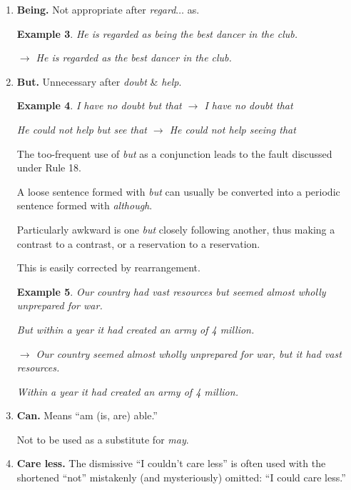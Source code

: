 \documentclass{article}
\newtheorem{example}{Example}
\begin{document}
\begin{enumerate}
\begin{example}
		$\to$ No agreement has yet been reached.
	\end{example}
	The chief exception is at the beginning of a sentence, where {\it yet} means something different.
	\begin{example}
		Yet (\emph{or} despite everything) he has not succeeded.
		
		As yet (\emph{or} so far) he has not succeeded.
	\end{example}
	\item {\bf Being.} Not appropriate after {\it regard$\ldots$} as.
	\begin{example}
		He is regarded as being the best dancer in the club.
		
		$\to$ He is regarded as the best dancer in the club.
	\end{example}
	\item {\bf But.} Unnecessary after {\it doubt} \& {\it help}.
	\begin{example}
		I have no doubt but that $\to$ I have no doubt that
		
		He could not help but see that $\to$ He could not help seeing that
	\end{example}
	The too-frequent use of {\it but} as a conjunction leads to the fault discussed under Rule 18.
	
	A loose sentence formed with {\it but} can usually be converted into a periodic sentence formed with {\it although}.
	
	Particularly awkward is one {\it but} closely following another, thus making a contrast to a contrast, or a reservation to a reservation.
	
	This is easily corrected by rearrangement.
	\begin{example}
		Our country had vast resources but seemed almost wholly unprepared for war.
		
		But within a year it had created an army of 4 million.
		
		$\to$ Our country seemed almost wholly unprepared for war, but it had vast resources.
		
		Within a year it had created an army of 4 million.
	\end{example}
	\item {\bf Can.} Means ``am (is, are) able.''
	
	Not to be used as a substitute for {\it may}.
	\item {\bf Care less.} The dismissive ``I couldn't care less'' is often used with the shortened ``not'' mistakenly (and mysteriously) omitted: ``I could care less.''
	

\end{enumerate}
\end{document}
